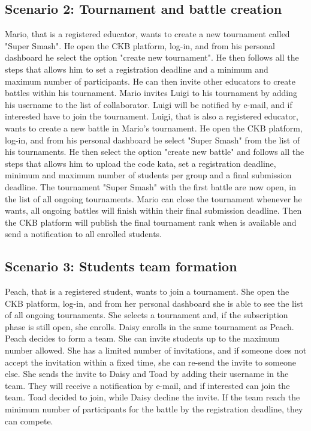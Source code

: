 \subsection{Scenario 2: Tournament and battle creation}
Mario, that is a registered educator, wants to create a new tournament called "Super Smash". He open the CKB platform, log-in, and from his personal dashboard he select the option "create new tournament". He then follows all the steps that allows him to set a registration deadline and a minimum and maximum number of participants. He can then invite other educators to create battles within his tournament. \newline
Mario invites Luigi to his tournament by adding his username to the list of collaborator. Luigi will be notified by e-mail, and if interested have to join the tournament. \newline
Luigi, that is also a registered educator, wants to create a new battle in Mario's tournament. He open the CKB platform, log-in, and from his personal dashboard he select "Super Smash" from the list of his tournaments.
He then select the option "create new battle" and follows all the steps that allows him to upload the code kata, set a registration deadline, minimum and maximum number of students per group and a final submission deadline.
The tournament "Super Smash" with the first battle are now open, in the list of all ongoing tournaments. \newline
Mario can close the tournament whenever he wants, all ongoing battles will finish within their final submission deadline. Then the CKB platform will publish the final tournament rank when is available and send a notification to all enrolled students.

\subsection{Scenario 3: Students team formation}
Peach, that is a registered student, wants to join a tournament. She open the CKB platform, log-in, and from her personal dashboard she is able to see the list of all ongoing tournaments. She selects a tournament and, if the subscription phase is still open, she enrolls.
Daisy enrolls in the same tournament as Peach. \newline
Peach decides to form a team. She can invite students up to the maximum number allowed. She has a limited number of invitations, and if someone does not accept the invitation within a fixed time, she can re-send the invite to someone else.
She sends the invite to Daisy and Toad by adding their username in the team. They will receive a notification by e-mail, and if interested can join the team. Toad decided to join, while Daisy decline the invite. \newline
If the team reach the minimum number of participants for the battle by the registration deadline, they can compete.

